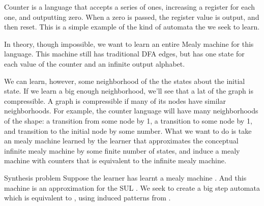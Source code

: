 Counter is a language that accepts a series of ones, 
increasing a register for each one,
and outputting zero.
When a zero is passed, 
the register value is output, and then reset.
This is a simple example of the kind of automata the we seek to learn.

In theory, though impossible,
we want to learn an entire Mealy machine for this language.
This machine still has traditional DFA edges,
but has one state for each value of the counter and an infinite output alphabet.

We can learn, however, some neighborhood of the the states about the initial state.
If we learn a big enough neighborhood, we'll see that a lat of the graph is compressible.
A graph is compressible if many of its nodes have similar neighborhoods.
For example,
the counter language will have many neighborhoods of the shape:
a transition from some node by 1,
a transition to some node by 1,
and transition to the initial node by some number.
What we want to do is take an mealy machine learned by the learner
that approximates the conceptual infinite mealy machine by some finite number of states,
and induce a mealy machine with counters that is equivalent to the infinite mealy machine.

\begin{definition}{Synthesis problem}
Suppose the learner has learnt a mealy machine .
And this machine is an approximation for the SUL .
We seek to create a big step automata 
which is equivalent to ,
using induced patterns from .
\end{definition}


